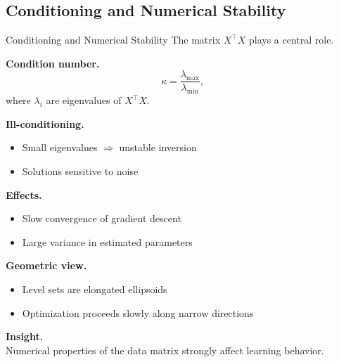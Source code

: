 \documentclass[aspectratio=169,11pt]{beamer}
\begin{document}
\subsection{Conditioning and Numerical Stability}
\begin{frame}[t,allowframebreaks]{Conditioning and Numerical Stability}
\small
The matrix $X^\top X$ plays a central role.

\textbf{Condition number.}\\ \[
\kappa = \frac{\lambda_{\max}}{\lambda_{\min}},
\]
where $\lambda_i$ are eigenvalues of $X^\top X$.

\textbf{Ill-conditioning.}\\ \begin{itemize}
    \item Small eigenvalues $\Rightarrow$ unstable inversion
    \item Solutions sensitive to noise
\end{itemize}

\textbf{Effects.}\\ \begin{itemize}
    \item Slow convergence of gradient descent
    \item Large variance in estimated parameters
\end{itemize}

\textbf{Geometric view.}\\ \begin{itemize}
    \item Level sets are elongated ellipsoids
    \item Optimization proceeds slowly along narrow directions
\end{itemize}

\textbf{Insight.}\\ Numerical properties of the data matrix strongly affect learning behavior.
\end{frame}
\end{document}
